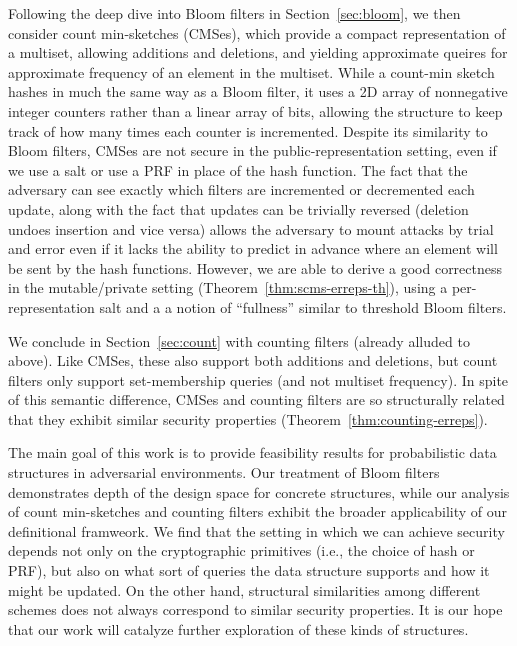Following the deep dive into Bloom filters in Section~\ref{sec:bloom}, we then
consider count min-sketches (CMSes), which provide a compact representation of a
multiset, allowing additions and deletions, and yielding approximate queires for
approximate frequency of an element in the multiset. While a count-min sketch
hashes in much the same way as a Bloom filter, it uses a 2D array of nonnegative
integer counters rather than a linear array of bits, allowing the structure to
keep track of how many times each counter is incremented.
%
Despite its similarity to Bloom filters, CMSes are not secure in the
public-representation setting, even if we use a salt or use a PRF in place of
the hash function. The fact that the adversary can see exactly which filters are
incremented or decremented each update, along with the fact that updates can be
trivially reversed (deletion undoes insertion and vice versa) allows the
adversary to mount attacks by trial and error even if it lacks the ability to
predict in advance where an element will be sent by the hash functions.
%
However, we are able to derive a good correctness in the mutable/private setting
(Theorem~\ref{thm:scms-erreps-th}), using a per-representation salt and a a
notion of ``fullness'' similar to threshold Bloom filters.

We conclude in Section~\ref{sec:count} with counting filters (already alluded
to above).
%
Like CMSes, these also support both additions and deletions, but count filters
only support set-membership queries (and not multiset frequency).
%
In spite of this semantic difference, CMSes and counting filters are
so structurally related that they exhibit similar security properties
(Theorem~\ref{thm:counting-erreps}).

%
The main goal of this work is to provide feasibility results for probabilistic
data structures in adversarial environments. Our treatment of Bloom filters
demonstrates depth of the design space for concrete structures, while our
analysis of count min-sketches and counting filters exhibit the broader
applicability of our definitional framweork.
%
We find that the setting in which we can achieve security depends not only on
the cryptographic primitives (i.e., the choice of hash or PRF), but also on what
sort of queries the data structure supports and how it might be updated. On the
other hand, structural similarities among different schemes does not always
correspond to similar security properties.
%
It is our hope that our work will catalyze further exploration of these kinds of
structures.


